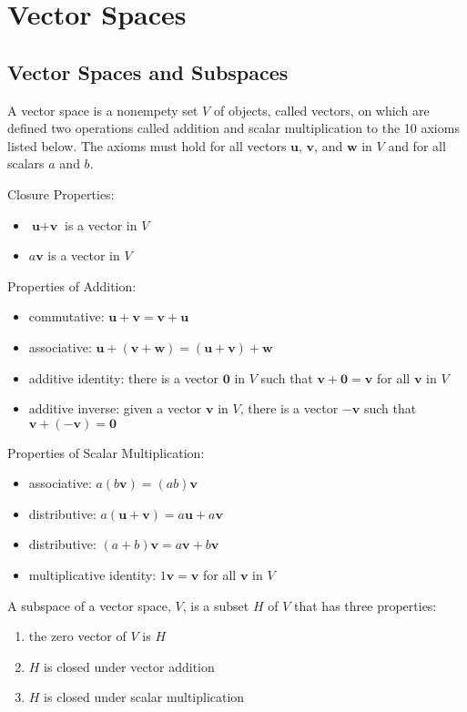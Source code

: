 \documentclass[../linalg.tex]{subfiles}
\begin{document}
\chapter{Vector Spaces}
\section{Vector Spaces and Subspaces}
A vector space is a nonempety set $V$ of objects, called vectors, on which are defined two operations called addition and scalar multiplication to the 10 axioms listed below. The axioms must hold for all vectors $\textbf{u}$, $\textbf{v}$, and $\textbf{w}$ in $V$ and for all scalars $a$ and $b$.

Closure Properties:
\begin{itemize}
    \item $\textbf{u}+\textbf{v}$ is a vector in $V$
    \item $a\textbf{v}$ is a vector in $V$
\end{itemize}

Properties of Addition:
\begin{itemize}
    \item commutative: $\textbf{u}+\textbf{v}=\textbf{v}+\textbf{u}$
    \item associative: $\textbf{u}+(\textbf{v}+\textbf{w})=(\textbf{u}+\textbf{v})+\textbf{w}$
    \item additive identity: there is a vector $\textbf{0}$ in $V$ such that $\textbf{v}+\textbf{0}=\textbf{v}$ for all $\textbf{v}$ in $V$
    \item additive inverse: given a vector $\textbf{v}$ in $V$, there is a vector $-\textbf{v}$ such that $\textbf{v}+(-\textbf{v})=\textbf{0}$
\end{itemize}

Properties of Scalar Multiplication:
\begin{itemize}
    \item associative: $a(b\textbf{v})=(ab)\textbf{v}$
    \item distributive: $a(\textbf{u}+\textbf{v})=a\textbf{u}+a\textbf{v}$
    \item distributive: $(a+b)\textbf{v}=a\textbf{v}+b\textbf{v}$
    \item multiplicative identity: $1\textbf{v}=\textbf{v}$ for all $\textbf{v}$ in $V$
\end{itemize}

A subspace of a vector space, $V$, is a subset $H$ of $V$ that has three properties:
\begin{enumerate}
    \item the zero vector of $V$ is $H$
    \item $H$ is closed under vector addition 
    \item $H$ is closed under scalar multiplication
\end{enumerate}
\end{document}
